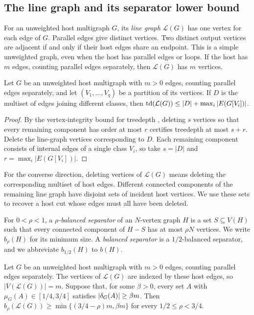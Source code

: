 \subsection{The line graph and its separator lower bound}

For an unweighted host multigraph $G$, its \emph{line graph}
$\mathcal{L}(G)$ has one vertex for each edge of $G$. Parallel edges
give distinct vertices. Two distinct output vertices are adjacent
if and only if their host edges share an endpoint.
This is a simple unweighted graph, even when the host has
parallel edges or loops. If the host has $m$ edges, counting parallel
edges separately, then $\mathcal{L}(G)$ has $m$ vertices.

\begin{lemma}\label{lem:sse-complete}
Let $G$ be an unweighted host multigraph with $m>0$ edges, counting
parallel edges separately, and let $(V_1,\ldots,V_q)$ be a partition
of its vertices. If $D$ is the multiset of edges joining different
classes, then $\operatorname{td}(\mathcal{L}(G))\leq |D|+\max_i |E(G[V_i])|$.
\end{lemma}

\begin{proof}
By the vertex-integrity bound for treedepth
\cite[Section~A.3 of the full version]{GimaEtAl2022Gap}, deleting
$s$ vertices so that every remaining component has order at most
$r$ certifies treedepth at most $s+r$. Delete the line-graph
vertices corresponding to $D$. Each remaining component consists
of internal edges of a single class $V_i$, so take $s=|D|$ and
$r=\max_i|E(G[V_i])|$.
\end{proof}

For the converse direction, deleting vertices of $\mathcal L(G)$
means deleting the corresponding multiset of host edges. Different
connected components of the remaining line graph have disjoint sets of incident
host vertices. We use these sets to recover a host cut whose edges
must all have been deleted.

For $0<\rho<1$, a \emph{$\rho$-balanced separator} of an $N$-vertex
graph $H$ is a set $S\subseteq V(H)$ such that every connected component of
$H-S$ has at most $\rho N$ vertices. We write $b_\rho(H)$ for its
minimum size. A \emph{balanced separator} is a $1/2$-balanced
separator, and we abbreviate $b_{1/2}(H)$ to $b(H)$.

\begin{lemma}
\label{lem:linegraph-separators}
Let $G$ be an unweighted host multigraph with $m>0$ edges, counting
parallel edges separately. The vertices of $\mathcal{L}(G)$ are
indexed by these host edges, so $|V(\mathcal{L}(G))|=m$.
Suppose that, for some $\beta>0$, every set $A$ with
$\mu_G(A)\in[1/4,3/4]$ satisfies $|\delta_G(A)|\geq\beta m$.
Then $b_\rho(\mathcal{L}(G))\geq\min\{(3/4-\rho)m,\beta m\}$
for every $1/2\leq\rho<3/4$.
\end{lemma}

